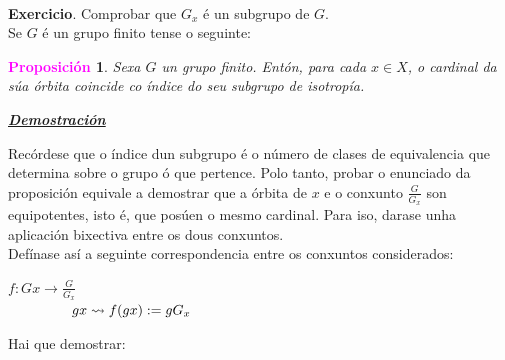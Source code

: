 \documentclass[twoside]{report}
\newcommand{\magbf}[1]{\textcolor{magenta}{\textbf{#1}}} %
\theoremstyle{mystyle}
\newtheorem{prop}{\magbf{Proposición}}[chapter]
\newenvironment{proposition}
{\begin{mdframed}[linecolor = magenta,backgroundcolor = classicrose, linewidth = 2mm]\begin{prop}}
{\end{prop}\end{mdframed}}
\begin{document}
\begin{center}
\\
\end{center}

\noindent \textbf{Exercicio}. Comprobar que $G_{x}$ é un subgrupo de $G$.\\

\noindent Se $G$ é un grupo finito tense o seguinte:\\

\begin{proposition}\label{prop1.10}
Sexa $G$ un grupo finito. Entón, para cada $x \in X$, o cardinal da súa órbita coincide co índice do seu subgrupo de isotropía.
\end{proposition}

\vspace{2mm}

\noindent \textbf{\textit{\underline{Demostración}}}

\vspace{2mm}

\noindent Recórdese que o índice dun subgrupo é o número de clases de equivalencia que determina sobre o grupo ó que pertence. Polo tanto, probar o enunciado da proposición equivale a demostrar que a órbita de $x$ e o conxunto $\displaystyle \frac{G}{G_{x}}$ son equipotentes, isto é, que posúen o mesmo cardinal. Para iso, darase unha aplicación bixectiva entre os dous conxuntos.\\

\noindent Defínase así a seguinte correspondencia entre os conxuntos considerados:\\

\begin{center}
    $f: Gx \longrightarrow \displaystyle \frac{G}{G_{x}}$ \\
        \vspace{2mm}
    $\hspace{16mm} gx \leadsto f(gx) := gG_{x}$
\end{center}

\noindent Hai que demostrar: \\
\end{document}
